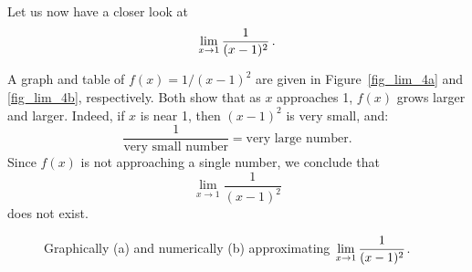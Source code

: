 \begin{example}
\label{ex_no_limit2}
Let us now have a closer look at 
$$\displaystyle\lim_{x\to 1} \dfrac{1}{(x-1)^2}\,.$$%


A graph and table of $f(x) = 1/(x-1)^2$ are given in Figure~\ref{fig_lim_4a} and \ref{fig_lim_4b}, respectively. Both show that as $x$ approaches 1, $f(x)$ grows larger and larger. Indeed, if $x$ is near 1, then $(x-1)^2$ is very small, and: 
$$\frac{1}{\text{very small number}} = \text{very large number}.$$
Since $f(x)$ is not approaching a single number, we conclude that $$\lim_{x\to 1}\frac{1}{(x-1)^2}$$ does not exist.

\begin{figure}[H]
  \centering
  \qquad
\caption{Graphically (a) and numerically (b) approximating $\displaystyle\lim_{x\to 1} \frac{1}{(x-1)^2}$.}
\end{figure}


\end{example}


